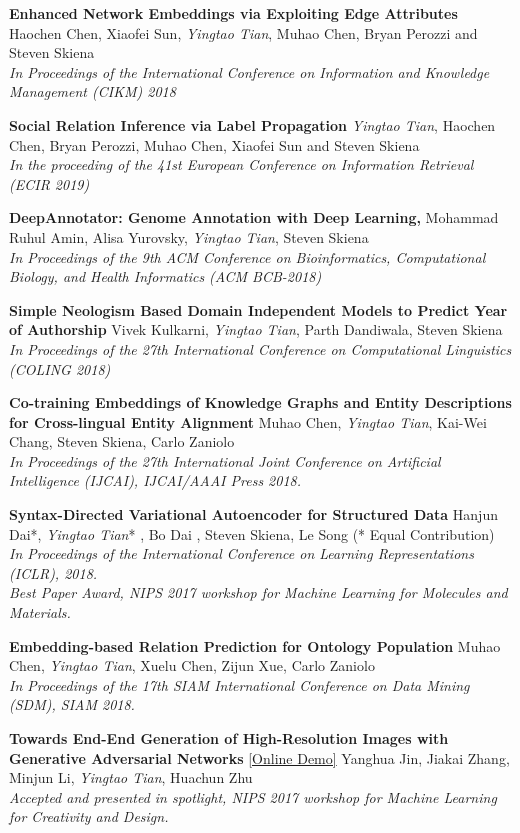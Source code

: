 \documentclass[line,margin]{cv}
\begin{document}
\begin{resume}
	{\bf  Enhanced Network Embeddings via Exploiting Edge Attributes}
	 Haochen Chen, Xiaofei Sun, \emph{Yingtao Tian}, Muhao Chen, Bryan Perozzi and Steven Skiena\\
	\emph{In Proceedings of the International Conference on Information and Knowledge Management (CIKM) 2018}

	{\bf Social Relation Inference via Label Propagation}
	\emph{Yingtao Tian}, Haochen Chen, Bryan Perozzi, Muhao Chen, Xiaofei Sun and Steven Skiena\\
	\emph{In the proceeding of the 41st European Conference on Information Retrieval (ECIR 2019)}
	
	{\bf DeepAnnotator: Genome Annotation with Deep Learning,}
	Mohammad Ruhul Amin, Alisa Yurovsky, \emph{Yingtao Tian}, Steven Skiena \\
	\emph{In Proceedings of the 9th ACM Conference on Bioinformatics, Computational Biology, and Health Informatics (ACM BCB-2018)}
	
	{\bf Simple Neologism Based Domain Independent Models to Predict Year of Authorship}
	 Vivek Kulkarni, \emph{Yingtao Tian}, Parth Dandiwala, Steven Skiena \\
	\emph{In Proceedings of the 27th International Conference on Computational Linguistics (COLING 2018)}

	{\bf Co-training Embeddings of Knowledge Graphs and Entity Descriptions for Cross-lingual Entity Alignment}
	Muhao Chen, \emph{Yingtao Tian}, Kai-Wei Chang, Steven Skiena, Carlo Zaniolo\\
	\emph{In Proceedings of the 27th International Joint Conference on Artificial Intelligence (IJCAI), IJCAI/AAAI Press 2018.}
	
  {\bf Syntax-Directed Variational Autoencoder for Structured Data}
  Hanjun Dai*, \emph{Yingtao Tian}* , Bo Dai , Steven Skiena, Le Song (* Equal Contribution)\\
  \emph{In Proceedings of the International Conference on Learning Representations (ICLR), 2018. \\
  Best Paper Award, NIPS 2017 workshop for Machine Learning for Molecules and Materials.}
  
	{\bf Embedding-based Relation Prediction for Ontology Population}
	Muhao Chen, \emph{Yingtao Tian}, Xuelu Chen, Zijun Xue, Carlo Zaniolo\\
	\emph{In Proceedings of the 17th SIAM International Conference on Data Mining (SDM), SIAM 2018.}

  {\bf Towards End-End Generation of High-Resolution Images with Generative Adversarial Networks}
  \href{http://make.girls.moe/#/}{[Online Demo]}
  Yanghua Jin, Jiakai Zhang, Minjun Li, \emph{Yingtao Tian}, Huachun Zhu\\
  \emph{Accepted and presented in spotlight, NIPS 2017 workshop for Machine Learning for Creativity and Design.}


\end{resume}
\end{document}

